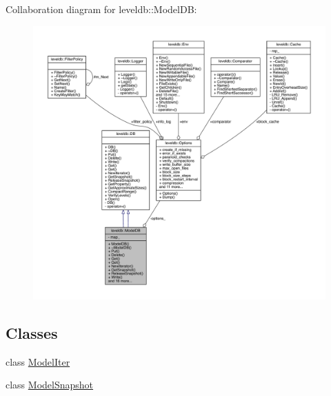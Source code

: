 Collaboration diagram for leveldb\+:\+:Model\+D\+B\+:
\nopagebreak
\begin{figure}[H]
\begin{center}
\leavevmode
\includegraphics[width=350pt]{classleveldb_1_1_model_d_b__coll__graph}
\end{center}
\end{figure}
\subsection*{Classes}
\begin{DoxyCompactItemize}
\item 
class \hyperlink{classleveldb_1_1_model_d_b_1_1_model_iter}{Model\+Iter}
\item 
class \hyperlink{classleveldb_1_1_model_d_b_1_1_model_snapshot}{Model\+Snapshot}
\end{DoxyCompactItemize}
